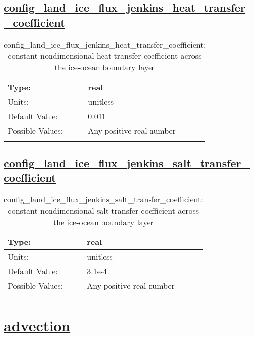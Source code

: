 \subsection[config\_land\_ice\_flux\_jenkins\_heat\_transfer\_coefficient]{\hyperref[sec:nm_tab_land_ice_fluxes]{config\_land\_ice\_flux\_jenkins\_heat\_transfer\_coefficient}}
\label{subsec:nm_sec_config_land_ice_flux_jenkins_heat_transfer_coefficient}
\begin{center}
\begin{longtable}{| p{2.0in} || p{4.0in} |}
    \hline
    Type: & real \\
    \hline
    Units: & \si{unitless} \\
    \hline
    Default Value: & 0.011 \\
    \hline
    Possible Values: & Any positive real number \\
    \hline
    \caption{config\_land\_ice\_flux\_jenkins\_heat\_transfer\_coefficient: constant nondimensional heat transfer coefficient across the ice-ocean boundary layer}
\end{longtable}
\end{center}
\subsection[config\_land\_ice\_flux\_jenkins\_salt\_transfer\_coefficient]{\hyperref[sec:nm_tab_land_ice_fluxes]{config\_land\_ice\_flux\_jenkins\_salt\_transfer\_coefficient}}
\label{subsec:nm_sec_config_land_ice_flux_jenkins_salt_transfer_coefficient}
\begin{center}
\begin{longtable}{| p{2.0in} || p{4.0in} |}
    \hline
    Type: & real \\
    \hline
    Units: & \si{unitless} \\
    \hline
    Default Value: & 3.1e-4 \\
    \hline
    Possible Values: & Any positive real number \\
    \hline
    \caption{config\_land\_ice\_flux\_jenkins\_salt\_transfer\_coefficient: constant nondimensional salt transfer coefficient across the ice-ocean boundary layer}
\end{longtable}
\end{center}
\section[advection]{\hyperref[sec:nm_tab_advection]{advection}}
\label{sec:nm_sec_advection}
